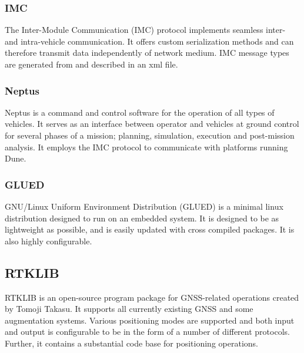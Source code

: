     \subsubsection{IMC}
    The Inter-Module Communication (IMC) protocol implements seamless inter- and intra-vehicle communication. It offers custom serialization methods and can therefore transmit data independently of network medium. IMC message types are generated from and described in an xml file.
    
    \subsubsection{Neptus}
    Neptus is a command and control software for the operation of all types of vehicles. It serves as an interface between operator and vehicles at ground control for several phases of a mission; planning, simulation, execution and post-mission analysis. It employs the IMC protocol to communicate with platforms running Dune.
    
    \subsubsection{GLUED}
    GNU/Linux Uniform Environment Distribution (GLUED) is a minimal linux distribution designed to run on an embedded system. It is designed to be as lightweight as possible, and is easily updated with cross compiled packages. It is also highly configurable.

\subsection{RTKLIB}
\label{seq:rtklib}
RTKLIB is an open-source program package for GNSS-related operations created by Tomoji Takasu. It supports all currently existing GNSS and some augmentation systems. Various positioning modes are supported and both input and output is configurable to be in the form of a number of different protocols. Further, it contains a substantial code base for positioning operations.